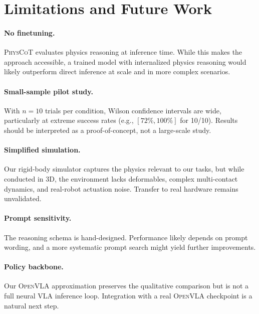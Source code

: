 \documentclass{article}
\newcommand{\physcot}{\textsc{PhysCoT}}
\newcommand{\openvla}{\textsc{OpenVLA}}
\begin{document}
\section{Limitations and Future Work}
\label{sec:limitations}

\paragraph{No finetuning.}
\physcot{} evaluates physics reasoning at inference time.
While this makes the approach accessible, a trained model with
internalized physics reasoning would likely outperform direct inference
at scale and in more complex scenarios.

\paragraph{Small-sample pilot study.}
With $n = 10$ trials per condition, Wilson confidence intervals are wide,
particularly at extreme success rates (e.g., $[72\%, 100\%]$ for 10/10).
Results should be interpreted as a proof-of-concept, not a large-scale study.

\paragraph{Simplified simulation.}
Our rigid-body simulator captures the physics relevant to our tasks,
but while conducted in 3D, the environment lacks deformables,
complex multi-contact dynamics, and real-robot actuation noise.
Transfer to real hardware remains unvalidated.

\paragraph{Prompt sensitivity.}
The reasoning schema is hand-designed.
Performance likely depends on prompt wording, and a more systematic
prompt search might yield further improvements.

\paragraph{Policy backbone.}
Our \openvla{} approximation preserves the qualitative comparison
but is not a full neural VLA inference loop.
Integration with a real \openvla{} checkpoint is a natural next step.
\end{document}
